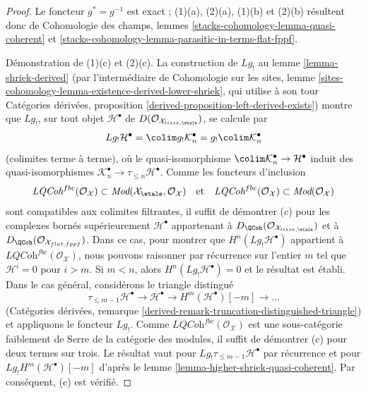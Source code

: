 \begin{proof}
Le foncteur $g^* = g^{-1}$ est exact ; (1)(a), (2)(a), (1)(b) et (2)(b)
résultent donc de Cohomologie des champs, lemmes
\ref{stacks-cohomology-lemma-quasi-coherent} et
\ref{stacks-cohomology-lemma-parasitic-in-terms-flat-fppf}.

\medskip\noindent
Démonstration de (1)(c) et (2)(c). La construction de $Lg_!$ au lemme
\ref{lemma-shriek-derived} (par l'intermédiaire de Cohomologie sur les sites,
lemme \ref{sites-cohomology-lemma-existence-derived-lower-shriek}, qui utilise
à son tour Catégories dérivées, proposition
\ref{derived-proposition-left-derived-exists}) montre que $Lg_!$, sur tout objet
$\mathcal{H}^\bullet$ de
$D(\mathcal{O}_{\mathcal{X}_{lisse,\etale}})$, se calcule par
$$
Lg_!\mathcal{H}^\bullet = \colim g_!\mathcal{K}_n^\bullet =
g_! \colim \mathcal{K}_n^\bullet
$$
(colimites terme à terme), où le quasi-isomorphisme
$\colim \mathcal{K}_n^\bullet \to \mathcal{H}^\bullet$ induit des
quasi-isomorphismes
$\mathcal{K}_n^\bullet \to \tau_{\leq n} \mathcal{H}^\bullet$. Comme les
foncteurs d'inclusion
$$
\textit{LQCoh}^{fbc}(\mathcal{O}_\mathcal{X}) \subset
\textit{Mod}(\mathcal{X}_\etale, \mathcal{O}_\mathcal{X})
\quad\text{et}\quad
\textit{LQCoh}^{fbc}(\mathcal{O}_\mathcal{X}) \subset
\textit{Mod}(\mathcal{O}_\mathcal{X})
$$
sont compatibles aux colimites filtrantes, il suffit de démontrer (c) pour les
complexes bornés supérieurement $\mathcal{H}^\bullet$ appartenant à
$D_\QCoh(\mathcal{O}_{\mathcal{X}_{lisse,\etale}})$ et à
$D_\QCoh(\mathcal{O}_{\mathcal{X}_{flat,fppf}})$. Dans ce cas, pour montrer que
$H^n(Lg_!\mathcal{H}^\bullet)$ appartient à
$\textit{LQCoh}^{fbc}(\mathcal{O}_\mathcal{X})$, nous pouvons raisonner par
récurrence sur l'entier $m$ tel que $\mathcal{H}^i = 0$ pour $i > m$. Si
$m < n$, alors $H^n(Lg_!\mathcal{H}^\bullet) = 0$ et le résultat est établi.
Dans le cas général, considérons le triangle distingué
$$
\tau_{\leq m - 1}\mathcal{H}^\bullet \to \mathcal{H}^\bullet \to
H^m(\mathcal{H}^\bullet)[-m] \to \ldots
$$
(Catégories dérivées, remarque
\ref{derived-remark-truncation-distinguished-triangle})
et appliquons le foncteur $Lg_!$. Comme
$\textit{LQCoh}^{fbc}(\mathcal{O}_\mathcal{X})$
est une sous-catégorie faiblement de Serre de la catégorie des modules, il
suffit de démontrer (c) pour deux termes sur trois. Le résultat vaut pour
$Lg_!\tau_{\leq m - 1}\mathcal{H}^\bullet$ par récurrence et pour
$Lg_!H^m(\mathcal{H}^\bullet)[-m]$ d'après le lemme
\ref{lemma-higher-shriek-quasi-coherent}. Par conséquent, (c) est vérifié.


\end{proof}
